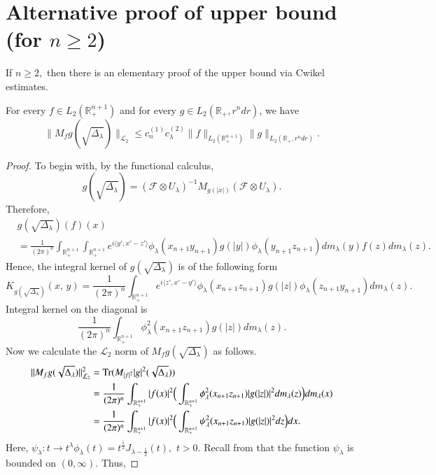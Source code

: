 \documentclass[12pt]{amsart}
\begin{document}
\section{Alternative proof of upper bound (for $n\geq 2$)}
\setcounter{equation}{0}

If $n\geq2,$ then there is an elementary proof of the upper bound via Cwikel estimates.

\begin{lemma}\label{L2Cwikel}
For every $f\in L_2(\mathbb{R}_+^{n+1})$ and for every $g\in L_2(\mathbb{R}_+,r^ndr)$, we have
$$\|M_fg(\sqrt{\Delta_{\lambda}})\|_{\mathcal{L}_2}\leq c_n^{(1)}c_{\lambda}^{(2)}\|f\|_{L_2(\mathbb{R}_+^{n+1})}\|g\|_{L_2(\mathbb{R}_+,r^ndr)}.$$
\end{lemma}
\begin{proof} To begin with, by the functional calculus,
$$g(\sqrt{\Delta_{\lambda}})=(\mathcal{F}\otimes U_{\lambda})^{-1}M_{g(|x|)}(\mathcal{F}\otimes U_{\lambda}).$$
Therefore,
\begin{align*}
&g(\sqrt{\Delta_{\lambda}})(f)(x)\\
&=\frac{1}{(2\pi)^n}\int_{\mathbb{R}_+^{n+1}}\int_{\mathbb{R}_+^{n+1}}e^{i\langle y',x'-z'\rangle}\phi_\lambda(x_{n+1}y_{n+1})g(|y|)\phi_\lambda(y_{n+1}z_{n+1})dm_\lambda(y)f(z)dm_\lambda(z).
\end{align*}
Hence, the integral kernel of $g(\sqrt{\Delta_{\lambda}})$ is of the following form
$$K_{g(\sqrt{\Delta_{\lambda}})}(x,\,y)=\frac{1}{(2\pi)^n}\int_{\mathbb{R}_+^{n+1}}e^{i\langle z',x'-y'\rangle}\phi_\lambda(x_{n+1}z_{n+1})g(|z|)\phi_\lambda(z_{n+1}y_{n+1})dm_\lambda(z).$$
Integral kernel on the diagonal is
$$\frac{1}{(2\pi)^n}\int_{\mathbb{R}_+^{n+1}}\phi_\lambda^2(x_{n+1}z_{n+1})g(|z|)dm_\lambda(z).$$
Now we calculate the $\mathcal{L}_2$ norm of $M_fg(\sqrt{\Delta_{\lambda}})$ as follows.
\begin{align*}
\|M_fg(\sqrt{\Delta_{\lambda}})\|_{\mathcal{L}_2}^2&={\rm Tr}(M_{|f|^2}|g|^2(\sqrt{\Delta_{\lambda}}))\\
&=\frac{1}{(2\pi)^n}\int_{\mathbb{R}_+^{n+1}}|f(x)|^2\Big(\int_{\mathbb{R}_+^{n+1}}\phi_\lambda^2(x_{n+1}z_{n+1})|g(|z|)|^2dm_\lambda(z)\Big)dm_\lambda(x)\\
&=\frac{1}{(2\pi)^n}\int_{\mathbb{R}_+^{n+1}}|f(x)|^2\Big(\int_{\mathbb{R}_+^{n+1}}\psi_{\lambda}^2(x_{n+1}z_{n+1})|g(|z|)|^2dz\Big)dx.
\end{align*}
Here, $\psi_{\lambda}:t\to t^{\lambda}\phi_{\lambda}(t)=t^{\frac12}J_{\lambda-\frac12}(t),$ $t>0.$ Recall from \cite[p.364]{MR167642} that the function $\psi_{\lambda}$ is bounded on $(0,\infty).$ Thus,

\end{proof}
\end{document}
